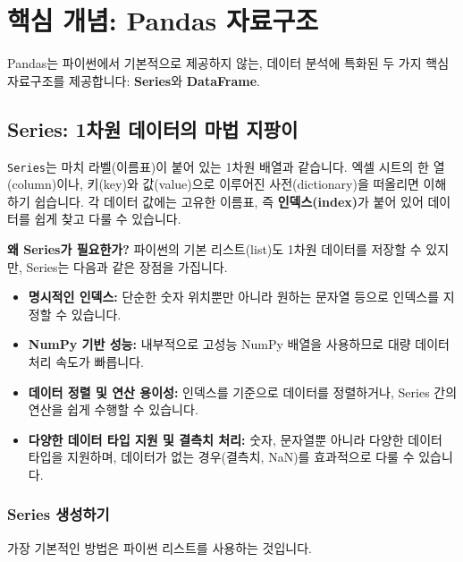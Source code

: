 \documentclass[11pt,a4paper]{book}
\theoremstyle{definition}
\begin{document}
\section{핵심 개념: Pandas 자료구조}

Pandas는 파이썬에서 기본적으로 제공하지 않는, 데이터 분석에 특화된 두 가지 핵심 자료구조를 제공합니다: \textbf{Series}와 \textbf{DataFrame}.

\subsection{Series: 1차원 데이터의 마법 지팡이}

\begin{tcolorbox}[title={Series란?}]
\texttt{Series}는 마치 라벨(이름표)이 붙어 있는 1차원 배열과 같습니다. 엑셀 시트의 한 열(column)이나, 키(key)와 값(value)으로 이루어진 사전(dictionary)을 떠올리면 이해하기 쉽습니다. 각 데이터 값에는 고유한 이름표, 즉 \textbf{인덱스(index)}가 붙어 있어 데이터를 쉽게 찾고 다룰 수 있습니다.
\end{tcolorbox}

\textbf{왜 Series가 필요한가?}
파이썬의 기본 리스트(list)도 1차원 데이터를 저장할 수 있지만, Series는 다음과 같은 장점을 가집니다.
\begin{itemize}
    \item \textbf{명시적인 인덱스:} 단순한 숫자 위치뿐만 아니라 원하는 문자열 등으로 인덱스를 지정할 수 있습니다.
    \item \textbf{NumPy 기반 성능:} 내부적으로 고성능 NumPy 배열을 사용하므로 대량 데이터 처리 속도가 빠릅니다.
    \item \textbf{데이터 정렬 및 연산 용이성:} 인덱스를 기준으로 데이터를 정렬하거나, Series 간의 연산을 쉽게 수행할 수 있습니다.
    \item \textbf{다양한 데이터 타입 지원 및 결측치 처리:} 숫자, 문자열뿐 아니라 다양한 데이터 타입을 지원하며, 데이터가 없는 경우(결측치, NaN)를 효과적으로 다룰 수 있습니다.
\end{itemize}

\subsubsection{Series 생성하기}

가장 기본적인 방법은 파이썬 리스트를 사용하는 것입니다.
\end{document}
